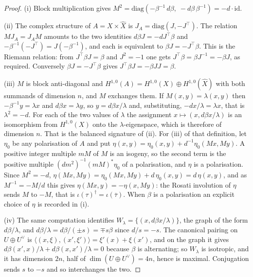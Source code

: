 \documentclass[11pt,reqno]{amsart}
\theoremstyle{plain}
\theoremstyle{definition}
\theoremstyle{remark}
\newcommand{\bbar}[1]{\overline{#1}}
\begin{document}
\begin{proof}
(i) Block multiplication gives
$M^{2}=\mathrm{diag}(-\beta^{-1}\,d\beta,\;-d\beta\,\beta^{-1})=-d\cdot\mathrm{id}$.

(ii) The complex structure of $A=X\times\widehat{X}$ is
$J_{A}=\mathrm{diag}(J,-J^{\top})$. The relation $MJ_{A}=J_{A}M$ amounts to
the two identities $d\beta J=-dJ^{\top}\beta$ and
$-\beta^{-1}(-J^{\top})=J(-\beta^{-1})$, and each is equivalent to
$\beta J=-J^{\top}\beta$. This is the Riemann relation: from
$J^{\top}\beta J=\beta$ and $J^{2}=-1$ one gets
$J^{\top}\beta=\beta J^{-1}=-\beta J$, as required. Conversely
$\beta J=-J^{\top}\beta$ gives $J^{\top}\beta J=-\beta J J=\beta$.

(iii) $M$ is block anti-diagonal and $H^{1,0}(A)=H^{1,0}(X)\oplus
H^{1,0}(\widehat{X})$ with both summands of dimension $n$, and $M$ exchanges
them. If $M(x,y)=\lambda(x,y)$ then $-\beta^{-1}y=\lambda x$ and
$d\beta x=\lambda y$, so $y=d\beta x/\lambda$ and, substituting,
$-dx/\lambda=\lambda x$, that is $\lambda^{2}=-d$. For each of
the two values of $\lambda$ the assignment $x\mapsto(x,d\beta x/\lambda)$ is an
isomorphism from $H^{1,0}(X)$ onto the $\lambda$-eigenspace, which is
therefore of dimension $n$. That is the balanced signature of
(ii). For (iii) of that definition, let $\eta_{0}$ be any
polarisation of $A$ and put
$\eta(x,y)=\eta_{0}(x,y)+d^{-1}\eta_{0}(Mx,My)$. A positive integer multiple
$mM$ of $M$ is an isogeny, so the second term is the positive multiple
$(dm^{2})^{-1}(mM)^{*}\eta_{0}$ of a polarisation, and $\eta$ is a
polarisation. Since $M^{2}=-d$,
$\eta(Mx,My)=\eta_{0}(Mx,My)+d\,\eta_{0}(x,y)=d\,\eta(x,y)$, and as
$M^{-1}=-M/d$ this gives $\eta(Mx,y)=-\eta(x,My)$: the Rosati involution of
$\eta$ sends $M$ to $-M$, that is $\iota(\tau)^{\dagger}=\iota(\bbar{\tau})$.
When $\beta$ is a polarisation an explicit choice of $\eta$ is recorded in
(i).

(iv) The same computation identifies $W_{\lambda}=\{(x,d\beta x/\lambda)\}$,
the graph of the form $d\beta/\lambda$, and
$d\beta/\lambda=d\beta/(\pm s)=\mp s\beta$ since $d/s=-s$. The canonical
pairing on $U\oplus U^{\vee}$ is
$\langle(x,\xi),(x',\xi')\rangle=\xi'(x)+\xi(x')$, and on the graph it gives
$d\beta(x',x)/\lambda+d\beta(x,x')/\lambda=0$ because $\beta$ is alternating; so
$W_{\lambda}$ is isotropic, and it has dimension $2n$, half of
$\dim(U\oplus U^{\vee})=4n$, hence is maximal. Conjugation sends $s$ to $-s$
and so interchanges the two.
\end{proof}
\end{document}
